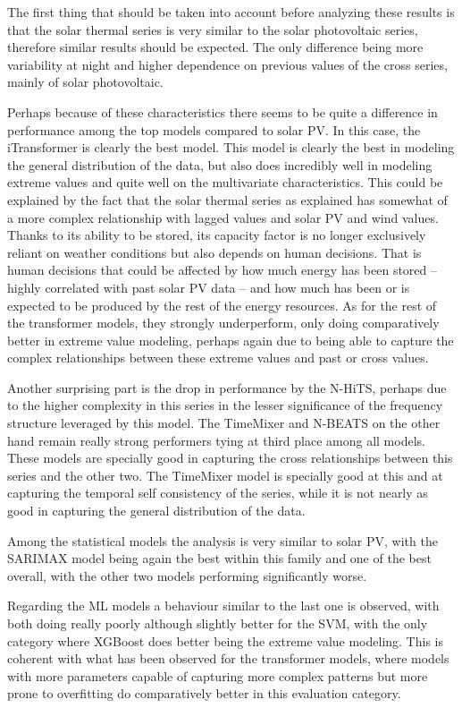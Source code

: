 The first thing that should be taken into account before analyzing these results is that the solar thermal series is very similar to the solar photovoltaic series, therefore similar results should be expected. The only difference being more variability at night and higher dependence on previous values of the cross series, mainly of solar photovoltaic. 

Perhaps because of these characteristics there seems to be quite a difference in performance among the top models compared to solar PV. In this case, the iTransformer is clearly the best model. This model is clearly the best in modeling the general distribution of the data, but also does incredibly well in modeling extreme values and quite well on the multivariate characteristics. This could be explained by the fact that the solar thermal series as explained has somewhat of a more complex relationship with lagged values and solar PV and wind values. Thanks to its ability to be stored, its capacity factor is no longer exclusively reliant on weather conditions but also depends on human decisions. That is human decisions that could be affected by how much energy has been stored -- highly correlated with past solar PV data -- and how much has been or is expected to be produced by the rest of the energy resources. As for the rest of the transformer models, they strongly underperform, only doing comparatively better in extreme value modeling, perhaps again due to being able to capture the complex relationships between these extreme values and past or cross values. 

Another surprising part is the drop in performance by the N-HiTS, perhaps due to the higher complexity in this series in the lesser significance of the frequency structure leveraged by this model. The TimeMixer and N-BEATS on the other hand remain really strong performers tying at third place among all models. These models are specially good in capturing the cross relationships between this series and the other two. The TimeMixer model is specially good at this and at capturing the temporal self consistency of the series, while it is not nearly as good in capturing the general distribution of the data.

Among the statistical models the analysis is very similar to solar PV, with the SARIMAX model being again the best within this family and one of the best overall, with the other two models performing significantly worse. 

Regarding the ML models a behaviour similar to the last one is observed, with both doing really poorly although slightly better for the SVM, with the only category where XGBoost does better being the extreme value modeling. This is coherent with what has been observed for the transformer models, where models with more parameters capable of capturing more complex patterns but more prone to overfitting do comparatively better in this evaluation category. 

